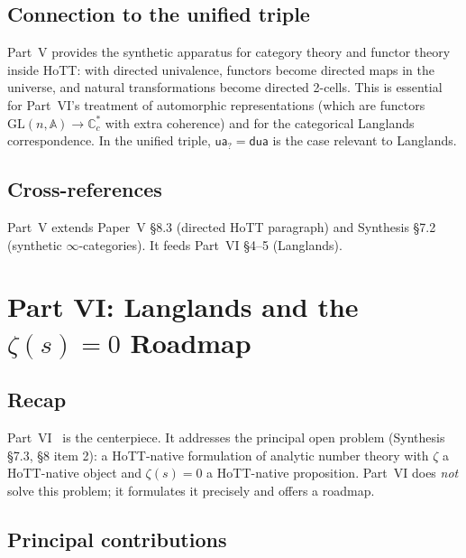 \documentclass[12pt]{article}
\theoremstyle{definition}
\theoremstyle{remark}
\newcommand{\C}{\mathbb{C}}
\newcommand{\Cc}{\C_{c}}
\newcommand{\ua}{\mathsf{ua}}
\newcommand{\dua}{\mathsf{dua}}
\begin{document}
\subsection{Connection to the unified triple}

Part~V provides the synthetic apparatus for category theory and functor
theory inside HoTT: with directed univalence, functors become directed
maps in the universe, and natural transformations become directed
2-cells. This is essential for Part~VI's treatment of automorphic
representations (which are functors $\mathrm{GL}(n,\mathbb{A}) \to \Cc^*$
with extra coherence) and for the categorical Langlands correspondence.
In the unified triple, $\ua_{?} = \dua$ is the case relevant to Langlands.

\subsection{Cross-references}

Part~V extends Paper~V \S 8.3 (directed HoTT paragraph) and Synthesis
\S 7.2 (synthetic $\infty$-categories). It feeds Part~VI \S 4--5
(Langlands).

\section{Part VI: Langlands and the \texorpdfstring{$\zeta(s)=0$}{zeta(s)=0} Roadmap}\label{sec:partVI}

\subsection{Recap}

Part~VI~\cite{langlandsAnalytic} is the centerpiece. It addresses the
principal open problem (Synthesis \S 7.3, \S 8 item 2): a HoTT-native
formulation of analytic number theory with $\zeta$ a HoTT-native object
and $\zeta(s)=0$ a HoTT-native proposition. Part~VI does \emph{not}
solve this problem; it formulates it precisely and offers a roadmap.

\subsection{Principal contributions}
\end{document}
